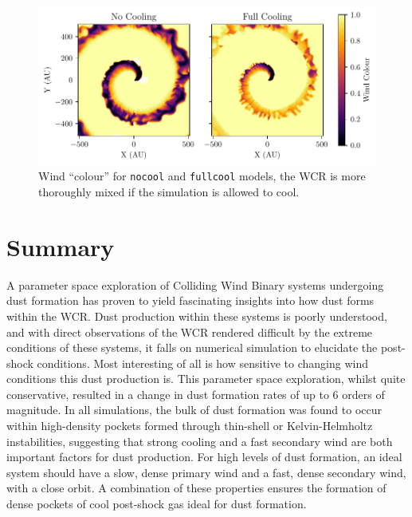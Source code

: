 \begin{figure}
  \centering
  \includegraphics{assets/results/radiative/radiative-r0.pdf}
  \caption[Wind mixing due to radiative methods]{Wind ``colour'' for \texttt{nocool} and \texttt{fullcool} models, the WCR is more thoroughly mixed if the simulation is allowed to cool.}
  \label{fig:radiative-windmixing}
\end{figure}

\section{Summary}

A parameter space exploration of Colliding Wind Binary systems undergoing dust formation has proven to yield fascinating insights into how dust forms within the WCR.
Dust production within these systems is poorly understood, and with direct observations of the WCR rendered difficult by the extreme conditions of these systems, it falls on numerical simulation to elucidate the post-shock conditions.
Most interesting of all is how sensitive to changing wind conditions this dust production is.
This parameter space exploration, whilst quite conservative, resulted in a change in dust formation rates of up to 6 orders of magnitude.
In all simulations, the bulk of dust formation was found to occur within high-density pockets formed through thin-shell or Kelvin-Helmholtz instabilities, suggesting that strong cooling and a fast secondary wind are both important factors for dust production.
For high levels of dust formation, an ideal system should have a slow, dense primary wind and a fast, dense secondary wind, with a close orbit.
A combination of these properties ensures the formation of dense pockets of cool post-shock gas ideal for dust formation.

